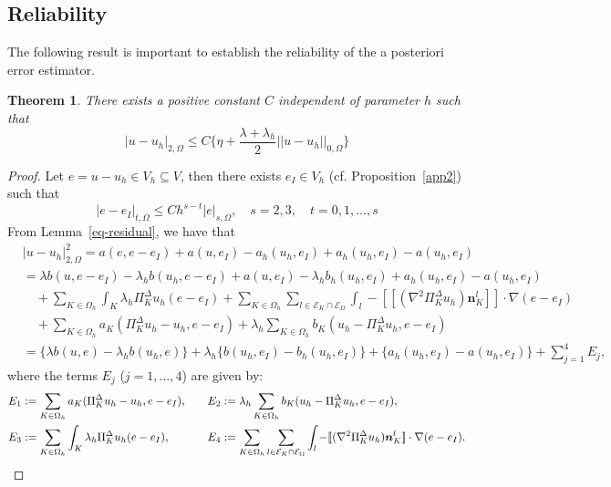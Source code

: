 \documentclass[final,reqno]{elsarticle}
\newtheorem{theorem}{Theorem}[section]
\def\O{\Omega}
\def\disp{\displaystyle}
\def\PiK{\Pi_{K}^{\Delta}}
\begin{document}
\subsection{Reliability}\label{Reliablity}
The following result is important to establish the reliability of the a posteriori error estimator.
\begin{theorem}\label{Th5.6}
	There exists a positive constant $C$ independent of parameter $h$ such that
	\begin{equation}
		|u-u_h|_{2,\Omega}\leq C \Big\{ \eta + \frac{\lambda+\lambda_h}{2}||u-u_h||_{0,\O} \Big\}
	\end{equation}
\end{theorem}
\begin{proof}
Let $e=u-u_h\in  V_h  \subseteq  V $, then there exists $e_I\in  V_h$ (cf. Proposition~\ref{app2}) such that
\begin{equation}\label{est_pol_error}
		|e-e_I |_{t,\O}\leq Ch^{s-t}|e |_{s,\O},\quad s=2,3, \quad t=0,1,...,s	
	\end{equation}
From Lemma~\ref{eq-residual}, we have that
\begin{align}
&|u-u_h|_{2,\O}^2%
=a(e,e-e_I)+a(u,e_I)-a_h(u_h,e_I)+a_h(u_h,e_I)-a(u_h,e_I)\nonumber\\
&= \lambda b(u,e-e_I)-\lambda_h b( u_h,e-e_I) +a(u,e_I)-\lambda_h b_h(u_h,e_I)+a_h(u_h,e_I)-a(u_h,e_I) \nonumber \\
&\quad + \sum\limits_{K\in \Omega_h} \int_{K}\lambda_h\PiK u_h(e-e_I) +\sum\limits_{K\in \Omega_h}\sum_{l\in \mathcal{E}_K\cap \mathcal{E}_{\O}}\int_l - [\![(\nabla^2\PiK u_h )\boldsymbol{n}_K^l]\!] \cdot \nabla (e-e_I)\nonumber\\
&\quad +\sum\limits_{K\in \Omega_h} a_K(\PiK u_h-u_h,e-e_I)+ \lambda_h\sum\limits_{K\in \Omega_h} b_{K}( u_h-\PiK u_h,e-e_I)\nonumber\\
&=\Big\{ \lambda b(u,e)-\lambda_h b(u_h,e)\Big\}+\lambda_h\Big\{b(u_h,e_I)-b_h(u_h,e_I) \Big\}+\Big\{ a_h(u_h,e_I)-a(u_h,e_I)\Big\}+\sum\limits_{j=1}^{4}E_j,\label{err_ap}
\end{align}
where the terms $E_j$ ($j=1,\dots,4$) are given by: 	
    \begin{align*}
        \begin{aligned}
			\disp E_1&:=\sum\limits_{K\in \Omega_h} a_K(\PiK u_h-u_h,e-e_I),\quad \disp &&E_2:=\lambda_h\sum\limits_{K\in \Omega_h} b_{K}( u_h-\PiK u_h,e-e_I),\\
			\disp E_3&:=\sum\limits_{K\in \Omega_h} \int_{K}\lambda_h\PiK u_h(e-e_I),\quad  \disp &&E_4:=\sum\limits_{K\in \Omega_h}\sum_{l\in \mathcal{E}_K\cap \mathcal{E}_{\O}}\int_l - [\![(\nabla^2\PiK u_h )\boldsymbol{n}_K^l]\!] \cdot \nabla (e-e_I).
        \end{aligned}
\end{align*}
	

\end{proof}
\end{document}
